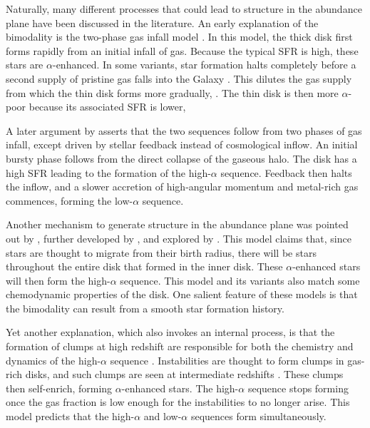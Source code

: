 \documentclass[twocolumn,linenumbers,trackchanges]{aastex631}
\begin{document}
Naturally, many different processes that could lead to structure in the abundance plane have been discussed in the literature. An early explanation of the bimodality is  the two-phase gas infall model \citep{1997ApJ...477..765C,2009IAUS..254..191C,2017MNRAS.472.3637G,2019A&A...623A..60S}. In this model, the thick disk first forms rapidly from an initial infall of gas. Because the typical SFR is high, these stars are $\alpha$-enhanced. In some variants, star formation halts completely before a second supply of pristine gas falls into the Galaxy \citep[][and references therein]{2024arXiv240511025S}. This dilutes the gas supply from which the thin disk forms more gradually, . The thin disk is then more $\alpha$-poor because its associated SFR is lower, 

A later argument by \citet{2021MNRAS.501.5176K} asserts that the two sequences follow from two phases of gas infall, except driven by stellar feedback instead of cosmological inflow. An initial bursty phase follows from the direct collapse of the gaseous halo. The disk has a high SFR leading to the formation of the high-$\alpha$ sequence. Feedback then halts the inflow, and a slower accretion of high-angular momentum and metal-rich gas commences, forming the low-$\alpha$ sequence.

Another mechanism to generate structure in the abundance plane was pointed out by \citet{2009MNRAS.396..203S}, further developed by \citet{2021MNRAS.507.5882S,2023MNRAS.523.3791C}, and explored by \citet{2011ApJ...737....8L,2021MNRAS.508.4484J}. This model claims that, since stars are thought to migrate from their birth radius, there will be stars throughout the entire disk that formed in the inner disk. These $\alpha$-enhanced stars will then form the high-$\alpha$ sequence. This model and its variants also match some chemodynamic properties of the disk. One salient feature of these models is that the bimodality can result from a smooth star formation history.

Yet another explanation, which also invokes an internal process, is that the formation of clumps at high redshift are responsible for both the chemistry and dynamics of the high-$\alpha$ sequence \citep{2019MNRAS.484.3476C,2020MNRAS.492.4716B,2021MNRAS.502..260B,2023ApJ...953..128G}. Instabilities are thought to form clumps in gas-rich disks, and such clumps are seen at intermediate redshifts \citep[$z\sim2$;][]{2005ApJ...627..632E,2007ApJ...658..763E}. These clumps then self-enrich, forming $\alpha$-enhanced stars. The high-$\alpha$ sequence stops forming once the gas fraction is low enough for the instabilities to no longer arise. This model predicts that the high-$\alpha$ and low-$\alpha$ sequences form simultaneously.
\end{document}
